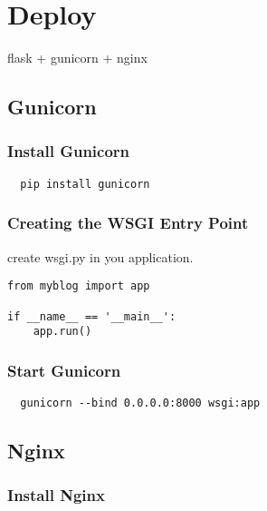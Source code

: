 
\chapter{Deploy}
\label{cha:deploy}

flask + gunicorn +  nginx




\section{Gunicorn}
\label{sec:gunicorn}

\subsection{Install Gunicorn}
\label{sec:install-gunicorn}

\begin{lstlisting}
  pip install gunicorn
\end{lstlisting}


\subsection{Creating the WSGI Entry Point}
\label{sec:application}

create wsgi.py in you application.

\begin{lstlisting}
from myblog import app

if __name__ == '__main__':
    app.run()
\end{lstlisting}



\subsection{Start Gunicorn}
\label{sec:start-gunicorn}

\begin{lstlisting}
  gunicorn --bind 0.0.0.0:8000 wsgi:app
\end{lstlisting}


\section{Nginx}
\label{sec:nginx}


\subsection{Install Nginx}
\label{sec:install-nginx}

